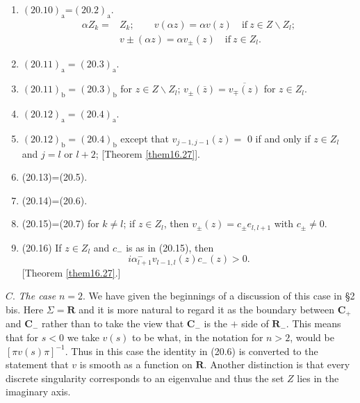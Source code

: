 \documentclass{surv-l}
\theoremstyle{plain}
\theoremstyle{definition}
\numberwithin{equation}{chapter}
\begin{document}
\begin{enumerate}
\item[]$\mathrm{(20.10)_{\mathrm{a}}}$=$\mathrm{(20.2)_{\mathrm{a}}}$.
\renewcommand\theequation{20.10$_{\mathrm{b}}$}
\begin{align}\label{eq20.10}
\alpha Z_{k}=&Z_{k}; \qquad v(\alpha z)=\alpha v(z) \quad \mathrm{if}\ z\in Z \backslash Z_{l};\\
&v\pm(\alpha z)=\alpha v_{\pm}(z)\quad \mathrm{if}\ z\in Z_{l}. \nonumber
\end{align}

\item[]$\mathrm{(20.11)_{a}=(20.3)_{a}}$.

\item[]$\mathrm{(20.11)_{b}=(20.3)_{b}}$ for $z\in Z\backslash Z_{l}$; $v_{\pm}(\overline{z})=\overline{v_{\mp}(z)}$ for $z\in Z_{l}$.

\item[]$\mathrm{(20.12)_{a}=(20.4)_{a}}$.

\item[]$\mathrm{(20.12)_{b}=(20.4)_{b}}$ except that $v_{j-1,j-1}(z)=$ 0 if and only if $z\in Z_{l}$ and $j=l$ or $l+2$; [Theorem \ref{them16.27}].

\item[](20.13)=(20.5).

\item[](20.14)=(20.6).

\item[](20.15)=(20.7) for $k\neq l$; if $z\in Z_{l}$, then $v_{\pm}(z)=c_{\pm} e_{l,l+1}$ with $c_{\pm}\neq 0$.

\item[](20.16) If $z\in Z_{l}$ and $c_{-}$ is as in (20.15), then
\begin{equation*}
i\alpha_{l+1}^{-}v_{l-1,l}(z)c_{-}(z)>0.
\end{equation*}
[Theorem \ref{them16.27}.]
\end{enumerate}

$C$. \emph{The case} $n=2$. We have given the beginnings of a discussion of this case in \S 2 bis. Here $\Sigma=\mathbf{R}$ and it is more natural to regard it as the boundary between $\mathbf{C}_{+}$ and $\mathbf{C}_{-}$ rather than to take the view that $\mathbf{C}_{-}$ is the $+$ side of $\mathbf{R}_{-}$. This means that for $s<0$ we take $v(s)$ to be what, in the notation for $n>2$, would be $[\pi v(s)\pi]^{-1}$. Thus in this case the identity in (20.6) is converted to the statement that $v$ is smooth as a function on $\mathbf{R}$. Another distinction is that every discrete singularity corresponds to an eigenvalue and thus the set $Z$ lies in the imaginary axis.
\end{document}
